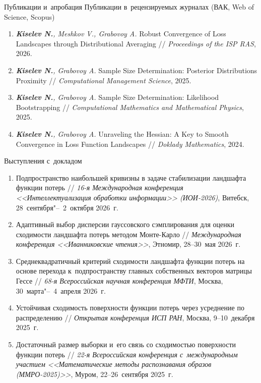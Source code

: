 \documentclass[aspectratio=169]{beamer}
\begin{document}
\begin{frame}{Публикации и~апробация}
    \fontsize{6.5pt}{7.7pt}\selectfont
    {Публикации в~рецензируемых журналах (ВАК, Web of Science, Scopus)}\par
    \begin{enumerate}
        \setlength{\itemsep}{0pt}
        \item \textit{\textbf{Kiselev N.}, Meshkov V., Grabovoy A.} Robust Convergence of Loss Landscapes through Distributional Averaging // \textit{Proceedings of the ISP RAS}, 2026.
        \item \textit{\textbf{Kiselev N.}, Grabovoy A.} Sample Size Determination: Posterior Distributions Proximity // \textit{Computational Management Science}, 2025.
        \item \textit{\textbf{Kiselev N.}, Grabovoy A.} Sample Size Determination: Likelihood Bootstrapping // \textit{Computational Mathematics and Mathematical Physics}, 2025.
        \item \textit{\textbf{Kiselev N.}, Grabovoy A.} Unraveling the Hessian: A Key to Smooth Convergence in Loss Function Landscapes // \textit{Doklady Mathematics}, 2024.
    \end{enumerate}
    {Выступления с~докладом}\par
    \begin{enumerate}
        \setlength{\itemsep}{0pt}
        \item Подпространство наибольшей кривизны в задаче стабилизации ландшафта функции потерь // \textit{16-я Международная конференция <<Интеллектуализация обработки информации>> (ИОИ-2026)}, Витебск, 28~сентября"--~2~октября 2026~г.
        \item Адаптивный выбор дисперсии гауссовского сэмплирования для оценки сходимости ландшафта потерь методом Монте-Карло // \textit{Международная конференция <<Иванниковские чтения>>}, Этномир, 28--30~мая 2026~г.
        \item Среднеквадратичный критерий сходимости ландшафта функции потерь на основе перехода к~подпространству главных собственных векторов матрицы Гессе // \textit{68-я Всероссийская научная конференция МФТИ}, Москва, 30~марта"--~4~апреля 2026~г.
        \item Устойчивая сходимость поверхности функции потерь через усреднение по распределению // \textit{Открытая конференция ИСП РАН}, Москва, 9--10~декабря 2025~г.
        \item Достаточный размер выборки и~его связь со сходимостью поверхности функции потерь // \textit{22-я Всероссийская конференция с~международным участием <<Математические методы распознавания образов (ММРО-2025)>>}, Муром, 22--26~сентября 2025~г.

\end{enumerate}
\end{frame}
\end{document}
